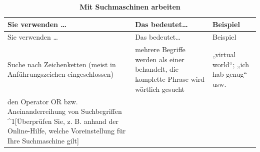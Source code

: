 \documentclass[]{book}
\theoremstyle{definition}
\theoremstyle{definition}
\theoremstyle{definition}
\theoremstyle{remark}
\begin{document}
\begin{longtable}[]{@{}lll@{}}
\caption{\textbf{\label{tab:suchmaschinen} Mit Suchmaschinen
arbeiten}}\tabularnewline
\toprule
\begin{minipage}[b]{0.31\columnwidth}\raggedright\strut
Sie verwenden \ldots{}\strut
\end{minipage} & \begin{minipage}[b]{0.27\columnwidth}\raggedright\strut
Das bedeutet\ldots{}\strut
\end{minipage} & \begin{minipage}[b]{0.33\columnwidth}\raggedright\strut
Beispiel\strut
\end{minipage}\tabularnewline
\midrule
\endfirsthead
\toprule
\begin{minipage}[b]{0.31\columnwidth}\raggedright\strut
Sie verwenden \ldots{}\strut
\end{minipage} & \begin{minipage}[b]{0.27\columnwidth}\raggedright\strut
Das bedeutet\ldots{}\strut
\end{minipage} & \begin{minipage}[b]{0.33\columnwidth}\raggedright\strut
Beispiel\strut
\end{minipage}\tabularnewline
\midrule
\endhead
\begin{minipage}[t]{0.31\columnwidth}\raggedright\strut
Suche nach Zeichenketten (meist in Anführungszeichen eingeschlossen)
\vspace{5mm}\strut
\end{minipage} & \begin{minipage}[t]{0.27\columnwidth}\raggedright\strut
mehrere Begriffe werden als einer behandelt, die komplette Phrase wird
wörtlich gesucht\vspace{5mm}\strut
\end{minipage} & \begin{minipage}[t]{0.33\columnwidth}\raggedright\strut
„virtual world``; „ich hab genug`` usw. \vspace{5mm}\strut
\end{minipage}\tabularnewline
\begin{minipage}[t]{0.31\columnwidth}\raggedright\strut
den Operator OR bzw. Aneinanderreihung von Suchbegriffen
\^{}1{[}Überprüfen Sie, z. B. anhand der Online-Hilfe, welche
Voreinstellung für Ihre Suchmaschine gilt{]}\vspace{5mm}\strut
\end{minipage} & \begin{minipage}[t]{0.27\columnwidth}\raggedright\strut

\end{minipage}
\end{longtable}
\end{document}
